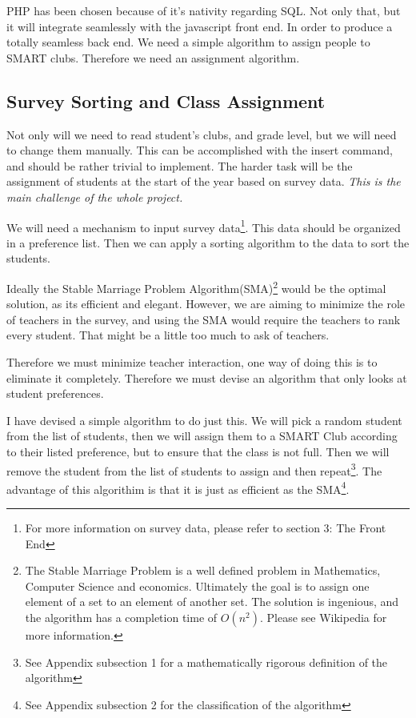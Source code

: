 \documentclass{article}
\begin{document}
PHP has been chosen because of it's nativity regarding SQL. Not only that, but it will integrate seamlessly with the javascript front end. In 
order to produce a totally seamless back end. We need a simple algorithm to assign people to SMART clubs. Therefore we need an assignment algorithm. 


\subsection{Survey Sorting and Class Assignment}
Not only will we need to read student's clubs, and grade level, but we will need to change them manually. This can be accomplished with the 
insert command, and should be rather trivial to implement. The harder task will be the assignment of students at the start of the year based on 
survey data. \emph{This is the main challenge of the whole project.}

We will need a mechanism to input survey data\footnote{For more information on survey data, please refer to section 3: The Front End}. This data should be 
organized in a preference list. Then we can apply a sorting algorithm to the data to sort the students. 

Ideally the Stable Marriage Problem Algorithm(SMA)\footnote{The Stable Marriage Problem is a well defined problem in Mathematics, Computer 
Science 
and economics. Ultimately the goal is to assign one element of a set to an element of another set. The solution is ingenious, and the algorithm 
has a completion time of $O(n^2)$. Please see Wikipedia for more information.} would be the optimal solution, as its efficient and elegant.
However, we are aiming to minimize the role of teachers in the survey, and using the SMA would require the teachers to rank every student. 
That might be a little too much to ask of teachers. 

Therefore we must minimize teacher interaction, one way of doing this is to eliminate it completely. Therefore we must devise an algorithm that only looks at student preferences. 

I have devised a simple algorithm to do just this. We will pick a random student from the list of students, then we will assign them to a SMART
Club according to their listed preference, but to ensure that the class is not full. Then we will remove the student from the list of students to assign and then repeat\footnote{See Appendix subsection 1 for a mathematically rigorous definition of the algorithm}. The advantage of this algorithim is that it is just as efficient as the SMA\footnote{See Appendix subsection 2 for the classification of the algorithm}.
\end{document}
